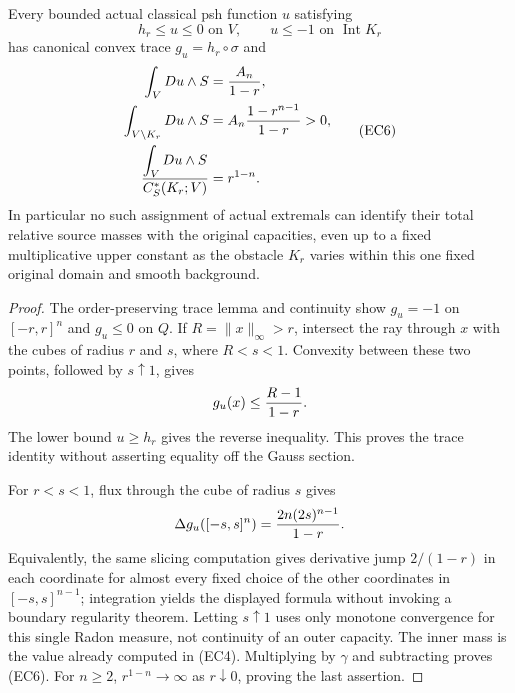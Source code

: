 \begin{proposition}
Every bounded actual classical psh function $u$ satisfying
\[
 h_r\le u\le0\text{ on }V,\qquad
 u\le-1\text{ on }\operatorname{Int}K_r
 \tag{EC5}
\]
has canonical convex trace $g_u=h_r\circ\sigma$ and
\[
 \begin{split}
 \int_V Du\wedge S&={A_n\over1-r},\\
 \int_{V\setminus K_r}Du\wedge S
   &=A_n{1-r^{n-1}\over1-r}>0,\\
 {\displaystyle\int_V Du\wedge S\over C_S^*(K_r;V)}
   &=r^{1-n}.
 \end{split}
 \tag{EC6}
\]
In particular no such assignment of actual extremals can identify their
total relative source masses with the original capacities, even up to a
fixed multiplicative upper constant as the obstacle $K_r$ varies within
this one fixed original domain and smooth background.
\end{proposition}
\begin{proof}
The order-preserving trace lemma and continuity show $g_u=-1$ on
$[-r,r]^n$ and $g_u\le0$ on $Q$. If $R=\|x\|_\infty>r$, intersect the
ray through $x$ with the cubes of radius $r$ and $s$, where $R<s<1$.
Convexity between these two points, followed by $s\uparrow1$, gives
\[
 g_u(x)\le {R-1\over1-r}.
\]
The lower bound $u\ge h_r$ gives the reverse inequality. This proves
the trace identity without asserting equality off the Gauss section.

For $r<s<1$, flux through the cube of radius $s$ gives
\[
 \Delta g_u([-s,s]^n)={2n(2s)^{n-1}\over1-r}.
\]
Equivalently, the same slicing computation gives derivative jump
$2/(1-r)$ in each coordinate for almost every fixed choice of the other
coordinates in $[-s,s]^{n-1}$; integration yields the displayed formula
without invoking a boundary regularity theorem. Letting $s\uparrow1$ uses
only monotone convergence for this single Radon measure, not continuity
of an outer capacity. The inner mass is the value already computed in
(EC4). Multiplying by $\gamma$ and subtracting proves (EC6). For
$n\ge2$, $r^{1-n}\to\infty$ as $r\downarrow0$, proving the last assertion.
\end{proof}


